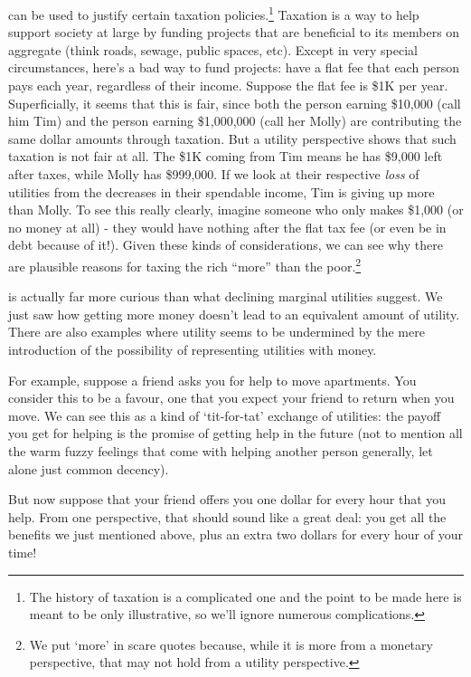 \documentclass[]{tufte-book}
\begin{document}
 can be used to justify certain taxation policies.\footnote{The history of taxation is a complicated one and the point to be made here is meant to be only illustrative, so we'll ignore numerous complications.} Taxation is a way to help support society at large by funding projects that are beneficial to its members on aggregate (think roads, sewage, public spaces, etc). Except in very special circumstances, here's a bad way to fund projects: have a flat fee that each person pays each year, regardless of their income. Suppose the flat fee is \$1K per year. Superficially, it seems that this is fair, since both the person earning \$10,000 (call him Tim) and the person earning \$1,000,000 (call her Molly) are contributing the same dollar amounts through taxation. But a utility perspective shows that such taxation is not fair at all. The \$1K coming from Tim means he has \$9,000 left after taxes, while Molly has \$999,000. If we look at their respective \emph{loss} of utilities from the decreases in their spendable income, Tim is giving up more than Molly. To see this really clearly, imagine someone who only makes \$1,000 (or no money at all) - they would have nothing after the flat tax fee (or even be in debt because of it!). Given these kinds of considerations, we can see why there are plausible reasons for taxing the rich ``more'' than the poor.\footnote{We put `more' in scare quotes because, while it is more from a monetary perspective, that may not hold from a utility perspective.}

 is actually far more curious than what declining marginal utilities suggest. We just saw how getting more money doesn't lead to an equivalent amount of utility. There are also examples where utility seems to be undermined by the mere introduction of the possibility of representing utilities with money.

For example, suppose a friend asks you for help to move apartments. You consider this to be a favour, one that you expect your friend to return when you move. We can see this as a kind of `tit-for-tat' exchange of utilities: the payoff you get for helping is the promise of getting help in the future (not to mention all the warm fuzzy feelings that come with helping another person generally, let alone just common decency).

But now suppose that your friend offers you one dollar for every hour that you help. From one perspective, that should sound like a great deal: you get all the benefits we just mentioned above, plus an extra two dollars for every hour of your time!
\end{document}
